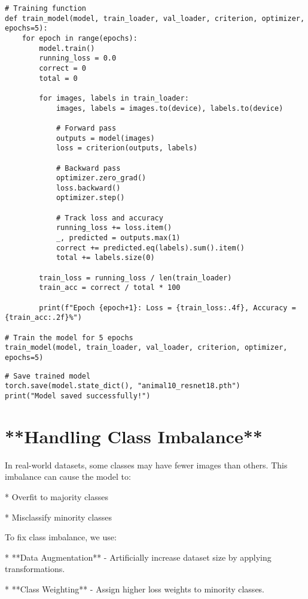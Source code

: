 \documentclass{article}
\begin{document}
\begin{verbatim}
# Training function
def train_model(model, train_loader, val_loader, criterion, optimizer, epochs=5):
    for epoch in range(epochs):
        model.train()
        running_loss = 0.0
        correct = 0
        total = 0

        for images, labels in train_loader:
            images, labels = images.to(device), labels.to(device)

            # Forward pass
            outputs = model(images)
            loss = criterion(outputs, labels)

            # Backward pass
            optimizer.zero_grad()
            loss.backward()
            optimizer.step()

            # Track loss and accuracy
            running_loss += loss.item()
            _, predicted = outputs.max(1)
            correct += predicted.eq(labels).sum().item()
            total += labels.size(0)

        train_loss = running_loss / len(train_loader)
        train_acc = correct / total * 100

        print(f"Epoch {epoch+1}: Loss = {train_loss:.4f}, Accuracy = {train_acc:.2f}%")

# Train the model for 5 epochs
train_model(model, train_loader, val_loader, criterion, optimizer, epochs=5)

\end{verbatim}

\begin{verbatim}
# Save trained model
torch.save(model.state_dict(), "animal10_resnet18.pth")
print("Model saved successfully!")
\end{verbatim}

\section{**Handling Class Imbalance**}

In real-world datasets, some classes may have fewer images than others. This imbalance can cause the model to:

*  Overfit to majority classes

*  Misclassify minority classes

To fix class imbalance, we use:

*  **Data Augmentation** - Artificially increase dataset size by applying transformations.

*  **Class Weighting** - Assign higher loss weights to minority classes.
\end{document}
